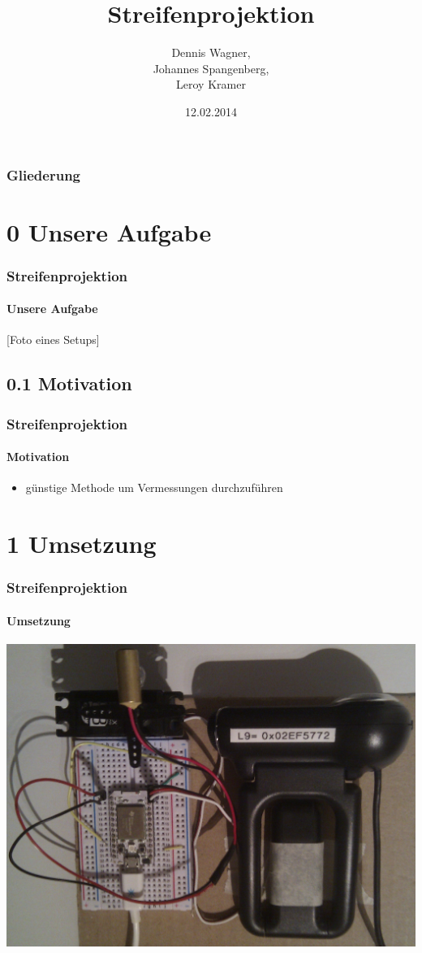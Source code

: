 \documentclass{beamer}
\title{Streifenprojektion}
\author{Dennis Wagner, \\ Johannes Spangenberg, \\ Leroy Kramer}
\date{12.02.2014}
\begin{document}
\frame{\titlepage} 


\begin{frame}
	\frametitle{Gliederung}
	\tableofcontents
\end{frame} 


\section{0 \hspace{5px} Unsere Aufgabe} 
\begin{frame}
	\frametitle{Streifenprojektion}
	\framesubtitle{Unsere Aufgabe}

	[Foto eines Setups]

\end{frame}


\subsection{0.1 \hspace{5px} Motivation} 
\begin{frame}
	\frametitle{Streifenprojektion}
	\framesubtitle{Motivation}

	\begin{itemize}
		\item günstige Methode um Vermessungen durchzuführen
	\end{itemize}

\end{frame}


\section{1 \hspace{5px} Umsetzung} 
\begin{frame}
	\frametitle{Streifenprojektion}
	\framesubtitle{Umsetzung}

	\includegraphics[width=0.9\linewidth]{includes/hardware.jpg}

\end{frame}
\end{document}
